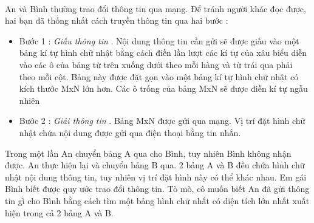  

An và Bình thường trao đổi thông tin qua mạng. Để tránh người khác đọc được, hai bạn đã thống nhất cách truyền thông tin qua hai bước :
\begin{itemize}
	\item Bước 1 : \emph{ Giấu thông tin } . Nội dung thông tin cần gửi sẽ được giấu vào một bảng kí tự hình chữ nhật bằng cách điền lần lượt các kí tự của xâu biểu diễn vào các ô của bảng từ trên xuống dưới theo mỗi hàng và từ trái qua phải theo mỗi cột. Bảng này được đặt gọn vào một bảng kí tự hình chữ nhật có kích thước MxN lớn hơn. Các ô trống của bảng MxN sẽ được điền kí tự ngẫu nhiên
\end{itemize}
\begin{itemize}
	\item Bước 2 : \emph{ Giải thông tin } . Bảng MxN được gửi qua mạng. Vị trí đặt hình chữ nhật chứa nội dung được gửi qua điện thoại bằng tin nhắn.
\end{itemize}

Trong một lần An chuyển bảng A qua cho Bình, tuy nhiên Bình không nhận được. An thực hiện lại và chuyển bảng B qua. 2 bảng A và B đều chứa hình chữ nhật nội dung thông tin, tuy nhiên vị trí đặt hình này có thể khác nhau. Em gái Bình biết được quy ước trao đổi thông tin. Tò mò, cô muốn biết An đã gửi thông tin gì cho Bình bằng cách tìm một bảng hình chữ nhất có diện tích lớn nhất xuất hiện trong cả 2 bảng A và B.